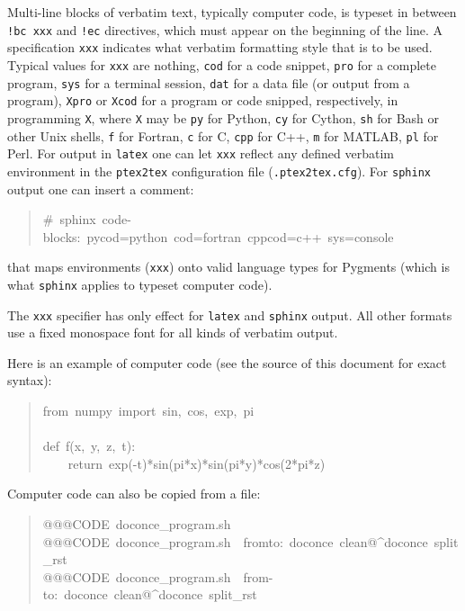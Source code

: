 \documentclass[a4paper]{article}
\begin{document}
Multi-line blocks of verbatim text, typically computer code, is typeset
in between \texttt{!bc xxx} and \texttt{!ec} directives, which must appear on the
beginning of the line. A specification \texttt{xxx} indicates what verbatim
formatting style that is to be used. Typical values for \texttt{xxx} are
nothing, \texttt{cod} for a code snippet, \texttt{pro} for a complete program,
\texttt{sys} for a terminal session, \texttt{dat} for a data file (or output from a
program),
\texttt{Xpro} or \texttt{Xcod} for a program or code snipped, respectively,
in programming \texttt{X}, where \texttt{X} may be \texttt{py} for Python,
\texttt{cy} for Cython, \texttt{sh} for Bash or other Unix shells,
\texttt{f} for Fortran, \texttt{c} for C, \texttt{cpp} for C++, \texttt{m} for MATLAB,
\texttt{pl} for Perl. For output in \texttt{latex} one can let \texttt{xxx} reflect any
defined verbatim environment in the \texttt{ptex2tex} configuration file
(\texttt{.ptex2tex.cfg}). For \texttt{sphinx} output one can insert a comment:
%
\begin{quote}{\ttfamily \raggedright \noindent
\#~sphinx~code-blocks:~pycod=python~cod=fortran~cppcod=c++~sys=console
}
\end{quote}

that maps environments (\texttt{xxx}) onto valid language types for
Pygments (which is what \texttt{sphinx} applies to typeset computer code).

The \texttt{xxx} specifier has only effect for \texttt{latex} and
\texttt{sphinx} output. All other formats use a fixed monospace font for all
kinds of verbatim output.

Here is an example of computer code (see the source of this document
for exact syntax):
%
\begin{quote}{\ttfamily \raggedright \noindent
from~numpy~import~sin,~cos,~exp,~pi\\
~\\
def~f(x,~y,~z,~t):\\
~~~~return~exp(-t)*sin(pi*x)*sin(pi*y)*cos(2*pi*z)
}
\end{quote}



Computer code can also be copied from a file:
%
\begin{quote}{\ttfamily \raggedright \noindent
@@@CODE~doconce\_program.sh\\
@@@CODE~doconce\_program.sh~~fromto:~doconce~clean@\textasciicircum{}doconce~split\_rst\\
@@@CODE~doconce\_program.sh~~from-to:~doconce~clean@\textasciicircum{}doconce~split\_rst
}
\end{quote}
\end{document}
